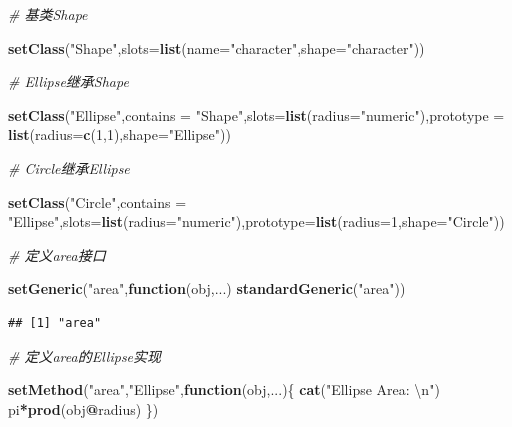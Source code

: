 \documentclass[]{book}
\newenvironment{Shaded}{\begin{snugshade}}{\end{snugshade}}
\newcommand{\KeywordTok}[1]{\textcolor[rgb]{0.13,0.29,0.53}{\textbf{#1}}}
\newcommand{\DataTypeTok}[1]{\textcolor[rgb]{0.13,0.29,0.53}{#1}}
\newcommand{\DecValTok}[1]{\textcolor[rgb]{0.00,0.00,0.81}{#1}}
\newcommand{\CharTok}[1]{\textcolor[rgb]{0.31,0.60,0.02}{#1}}
\newcommand{\StringTok}[1]{\textcolor[rgb]{0.31,0.60,0.02}{#1}}
\newcommand{\CommentTok}[1]{\textcolor[rgb]{0.56,0.35,0.01}{\textit{#1}}}
\newcommand{\ControlFlowTok}[1]{\textcolor[rgb]{0.13,0.29,0.53}{\textbf{#1}}}
\newcommand{\OperatorTok}[1]{\textcolor[rgb]{0.81,0.36,0.00}{\textbf{#1}}}
\newcommand{\NormalTok}[1]{#1}
\begin{document}
\begin{Shaded}
\begin{Highlighting}[]
\CommentTok{# 基类Shape}

\KeywordTok{setClass}\NormalTok{(}\StringTok{"Shape"}\NormalTok{,}\DataTypeTok{slots=}\KeywordTok{list}\NormalTok{(}\DataTypeTok{name=}\StringTok{"character"}\NormalTok{,}\DataTypeTok{shape=}\StringTok{"character"}\NormalTok{))}

\CommentTok{# Ellipse继承Shape}

\KeywordTok{setClass}\NormalTok{(}\StringTok{"Ellipse"}\NormalTok{,}\DataTypeTok{contains =} \StringTok{"Shape"}\NormalTok{,}\DataTypeTok{slots=}\KeywordTok{list}\NormalTok{(}\DataTypeTok{radius=}\StringTok{"numeric"}\NormalTok{),}\DataTypeTok{prototype =} \KeywordTok{list}\NormalTok{(}\DataTypeTok{radius=}\KeywordTok{c}\NormalTok{(}\DecValTok{1}\NormalTok{,}\DecValTok{1}\NormalTok{),}\DataTypeTok{shape=}\StringTok{"Ellipse"}\NormalTok{))}

\CommentTok{# Circle继承Ellipse}

\KeywordTok{setClass}\NormalTok{(}\StringTok{"Circle"}\NormalTok{,}\DataTypeTok{contains =} \StringTok{"Ellipse"}\NormalTok{,}\DataTypeTok{slots=}\KeywordTok{list}\NormalTok{(}\DataTypeTok{radius=}\StringTok{"numeric"}\NormalTok{),}\DataTypeTok{prototype=}\KeywordTok{list}\NormalTok{(}\DataTypeTok{radius=}\DecValTok{1}\NormalTok{,}\DataTypeTok{shape=}\StringTok{"Circle"}\NormalTok{))}

\CommentTok{# 定义area接口}

\KeywordTok{setGeneric}\NormalTok{(}\StringTok{"area"}\NormalTok{,}\ControlFlowTok{function}\NormalTok{(obj,...) }\KeywordTok{standardGeneric}\NormalTok{(}\StringTok{"area"}\NormalTok{))}
\end{Highlighting}
\end{Shaded}

\begin{verbatim}
## [1] "area"
\end{verbatim}

\begin{Shaded}
\begin{Highlighting}[]
\CommentTok{# 定义area的Ellipse实现}

\KeywordTok{setMethod}\NormalTok{(}\StringTok{"area"}\NormalTok{,}\StringTok{"Ellipse"}\NormalTok{,}\ControlFlowTok{function}\NormalTok{(obj,...)\{}
  \KeywordTok{cat}\NormalTok{(}\StringTok{"Ellipse Area: }\CharTok{\textbackslash{}n}\StringTok{"}\NormalTok{)}
\NormalTok{  pi}\OperatorTok{*}\KeywordTok{prod}\NormalTok{(obj}\OperatorTok{@}\NormalTok{radius)}
\NormalTok{\})}
\end{Highlighting}
\end{Shaded}
\end{document}

